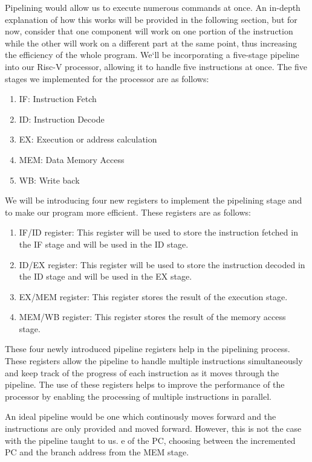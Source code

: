 \documentclass{article}
\begin{document}
Pipelining would allow us to execute numerous commands at once. An in-depth explanation of how this works will be provided in the following section, but for now, consider that one component will work on one portion of the instruction while the other will work on a different part at the same point, thus increasing the efficiency of the whole program. We`ll be incorporating a five-stage pipeline into our Risc-V processor, allowing it to handle five instructions at once. The five stages we implemented for the processor are as follows:

\begin{enumerate}
    \item IF: Instruction Fetch
    \item ID: Instruction Decode 
    \item EX: Execution or address calculation
    \item MEM: Data Memory Access
    \item WB: Write back

\end{enumerate}

We will be introducing four new registers to implement the pipelining stage and to make our program more efficient. These registers are as follows:

\begin{enumerate}
    \item IF/ID register: This register will be used to store the instruction fetched in the IF stage and will be used in the ID stage.
    \item ID/EX register: This register will be used to store the instruction decoded in the ID stage and will be used in the EX stage.
    \item EX/MEM register: This register stores the result of the execution stage.
    \item MEM/WB register: This register stores the result of the memory access stage.
\end{enumerate}

These four newly introduced pipeline registers help in the pipelining process. These registers allow the pipeline to handle multiple instructions simultaneously and keep track of the progress of each instruction as it moves through the pipeline. The use of these registers helps to improve the performance of the processor by enabling the processing of multiple instructions in parallel.

An ideal pipeline would be one which continously moves forward and the instructions are only provided and moved forward. However, this is not the case with the pipeline taught to us. e of the PC, choosing between the
incremented PC and the branch address from the MEM stage. 
\end{document}

